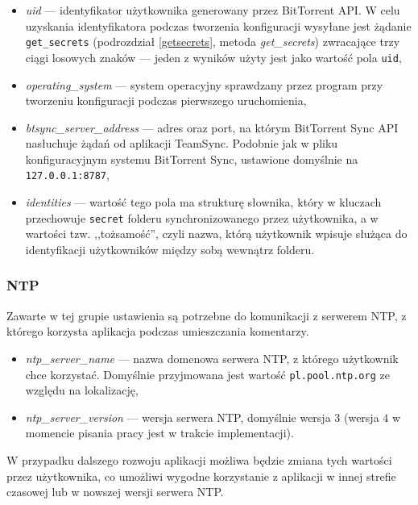 \begin{itemize}[noitemsep]
  \item \emph{uid} --- identyfikator użytkownika generowany przez BitTorrent API. W celu uzyskania identyfikatora podczas tworzenia konfiguracji wysyłane jest żądanie \texttt{get\_secrets} (podrozdział \ref{getsecrets}, metoda \emph{get\_secrets}) zwracające trzy ciągi losowych znaków --- jeden z wyników użyty jest jako wartość pola \texttt{uid},
  
  \item \emph{operating\_system} --- system operacyjny sprawdzany przez program przy tworzeniu konfiguracji podczas pierwszego uruchomienia,
  
  \item \emph{btsync\_server\_address} --- adres oraz port, na którym BitTorrent Sync API nasłuchuje żądań od aplikacji TeamSync. Podobnie jak w pliku konfiguracyjnym systemu BitTorrent Sync, ustawione domyślnie na \texttt{127.0.0.1:8787},
  
  \item \emph{identities} --- wartość tego pola ma strukturę słownika, który w kluczach przechowuje \texttt{secret} folderu synchronizowanego przez użytkownika, a w wartości tzw. ,,tożsamość'', czyli nazwa, którą użytkownik wpisuje służąca do identyfikacji użytkowników między sobą wewnątrz folderu.
\end{itemize}

\subsubsection*{NTP}

Zawarte w tej grupie ustawienia są potrzebne do komunikacji z serwerem NTP, z którego korzysta aplikacja podczas umieszczania komentarzy.

\begin{itemize}[noitemsep]
  \item \emph{ntp\_server\_name} --- nazwa domenowa serwera NTP, z którego użytkownik chce korzystać. Domyślnie przyjmowana jest wartość \texttt{pl.pool.ntp.org} ze względu na lokalizację,
  \item \emph{ntp\_server\_version} --- wersja serwera NTP, domyślnie wersja $3$ (wersja $4$ w momencie pisania pracy jest w trakcie implementacji).
\end{itemize}

W przypadku dalszego rozwoju aplikacji możliwa będzie zmiana tych wartości przez użytkownika, co umożliwi wygodne korzystanie z aplikacji w innej strefie czasowej lub w nowszej wersji serwera NTP.

